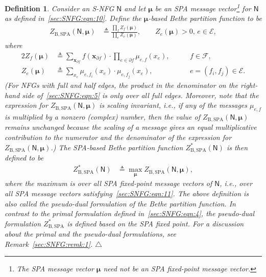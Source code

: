 \documentclass[journal]{IEEEtran}
\newcommand{\add}[1]{{\color{black}#1}}
\newtheorem{definition}[theorem]{Definition}
\newcommand{\manualendsymbol}[1]{%
  \leavevmode\unskip\penalty9999\hbox{}\nobreak\hfill
  \quad\hbox{#1}}
\newcommand{\edefinition}{\manualendsymbol{\ensuremath{\triangle}}}
\newcommand{\vect}[1]{ \bm{#1} }
\newcommand{\setEfull}{ \mathcal{E} }
\newcommand{\setF}{ \mathcal{F} }
\newcommand{\setpf}{ \partial f }
\newcommand{\xe}{ x_{e} }
\newcommand{\vmu}{ \vect{ \mu } }
\newcommand{\graphN}{ \mathsf{N} }
\newcommand{\defeq}{ \triangleq }
\newcommand{\etof}{ e,f }
\newcommand{\ZBSPA}{ Z_{\mathrm{B,SPA}} }
\newcommand{\ef}{ e,f }
\newcommand{\efi}{ e,f_i }
\newcommand{\efj}{ e,f_j }
\newcommand{\xf}{ \bm{x}_{\setpf} }
\newcommand*{\ie}{\textit{i.e.}}
\begin{document}
\begin{definition}
  \label{sec:SNFG:def:2}
  Consider an S-NFG $\graphN$ and let $\vmu $ be an SPA message
  vector\footnote{The SPA message vector $\vmu$ \add{need not be} an SPA
    fixed-point message vector.} for $\graphN$ as defined
  in~\eqref{sec:SNFG:eqn:10}. Define the $\vmu$-based Bethe partition function
  to be
  \begin{align}
    \ZBSPA(\graphN,\vmu)
     & \defeq
    \frac{\prod\limits_f Z_f(\vmu)
    }{\prod\limits_e Z_e(\vmu)}, \qquad
    Z_e(\vmu) > 0, \, e \in \setEfull,
    \label{sec:SNFG:eqn:5}
  \end{align}
  where
  \begin{alignat}{2}
    Z_f(\vmu)
     & \defeq
    \sum_{\xf}
    f(\xf)
    \cdot
    \prod_{e \in \setpf}
    \mu_{\etof}(\xe),
    \
     &        & \quad f \in \setF,
    \label{eqn: def of zf for snfg}                   \\
    Z_e(\vmu)
     & \defeq
    \sum_{\xe}
    \mu_{\efi}(\xe)
    \cdot \mu_{\efj}(\xe),
     &        & \quad e= (f_{i},f_{j}) \in \setEfull.
    \label{sec:SNFG:eqn:6}
  \end{alignat}
  (For NFGs with full and half edges, the product in the denominator on the
  right-hand side of~\eqref{sec:SNFG:eqn:5} is only over all full
  edges. Moreover, note that the expression for $\ZBSPA(\graphN,\vmu)$ is
  scaling invariant, \ie, if any of the messages $\mu_{\ef}$ is multiplied by
  a \add{nonzero (complex) number, then the value of $\ZBSPA(\graphN,\vmu)$
    remains unchanged because the scaling of a message gives an equal
    multiplicative contribution to the numerator and the denominator of the
    expression for $\ZBSPA(\graphN,\vmu)$.}) The SPA-based Bethe partition
  function $\ZBSPA^{*}(\graphN)$ is then defined to be
  \begin{align*}
    \ZBSPA^{*}(\graphN)
     & \defeq \max_{\vmu}
    \ZBSPA(\graphN,\vmu),
  \end{align*}
  where the maximum is over all SPA fixed-point message vectors of $\graphN$,
  \ie, over all SPA message vectors satisfying~\eqref{sec:SNFG:eqn:11}. The
  above definition is also called the pseudo-dual formulation of the Bethe
  partition function.  In contrast to the primal formulation defined
  in~\eqref{sec:SNFG:eqn:4}, the pseudo-dual formulation $ \ZBSPA^{*} $ is
  defined based on the SPA fixed point. For a discussion about the primal and
  the pseudo-dual formulations, see Remark~\ref{sec:SNFG:remk:1}.
  \edefinition
\end{definition}
\end{document}
